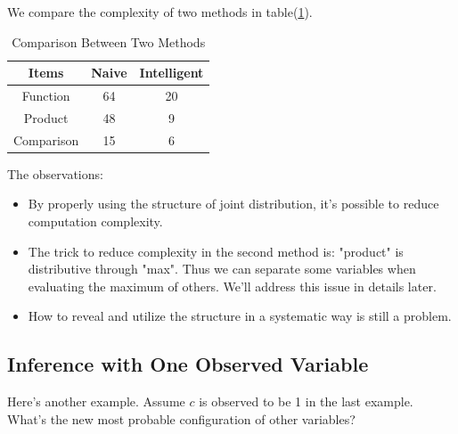 \documentclass[11pt,a4paper]{article}
\begin{document}

We compare the complexity of two methods in table(\ref{tbl:toy_cmp}). 

\begin{table}[htb]
\centering
	\caption{Comparison Between Two Methods}
	\label{tbl:toy_cmp}
	\begin{tabular}{c|cc}
	\hline
	Items & Naive & Intelligent \\
	\hline
	Function & 64 & 20 \\
	Product & 48 & 9 \\
	Comparison & 15 & 6 \\
	\hline
	\end{tabular}
\end{table}

The observations:
\begin{itemize}
	\item By properly using the structure of joint distribution, 
	it's possible to reduce computation complexity.
	\item The trick to reduce complexity in the second method is:
	"product" is distributive through "max". Thus we can 
	separate some variables when evaluating the maximum of 
	others. We'll address this issue in details later.   
	\item How to reveal and utilize the structure in a 
	systematic way is still a problem. 
\end{itemize}

\subsection{Inference with One Observed Variable}

Here's another example. Assume $c$ is observed to be 1 in 
the last example. What's the new most probable configuration of 
other variables? 
\end{document}
